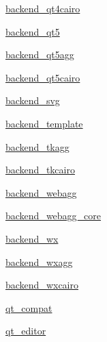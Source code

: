 \begin{DoxyCompactItemize}
 \hyperlink{namespacematplotlib_1_1backends_1_1backend__qt4cairo}{backend\+\_\+qt4cairo}
\item 
 \hyperlink{namespacematplotlib_1_1backends_1_1backend__qt5}{backend\+\_\+qt5}
\item 
 \hyperlink{namespacematplotlib_1_1backends_1_1backend__qt5agg}{backend\+\_\+qt5agg}
\item 
 \hyperlink{namespacematplotlib_1_1backends_1_1backend__qt5cairo}{backend\+\_\+qt5cairo}
\item 
 \hyperlink{namespacematplotlib_1_1backends_1_1backend__svg}{backend\+\_\+svg}
\item 
 \hyperlink{namespacematplotlib_1_1backends_1_1backend__template}{backend\+\_\+template}
\item 
 \hyperlink{namespacematplotlib_1_1backends_1_1backend__tkagg}{backend\+\_\+tkagg}
\item 
 \hyperlink{namespacematplotlib_1_1backends_1_1backend__tkcairo}{backend\+\_\+tkcairo}
\item 
 \hyperlink{namespacematplotlib_1_1backends_1_1backend__webagg}{backend\+\_\+webagg}
\item 
 \hyperlink{namespacematplotlib_1_1backends_1_1backend__webagg__core}{backend\+\_\+webagg\+\_\+core}
\item 
 \hyperlink{namespacematplotlib_1_1backends_1_1backend__wx}{backend\+\_\+wx}
\item 
 \hyperlink{namespacematplotlib_1_1backends_1_1backend__wxagg}{backend\+\_\+wxagg}
\item 
 \hyperlink{namespacematplotlib_1_1backends_1_1backend__wxcairo}{backend\+\_\+wxcairo}
\item 
 \hyperlink{namespacematplotlib_1_1backends_1_1qt__compat}{qt\+\_\+compat}
\item 
 \hyperlink{namespacematplotlib_1_1backends_1_1qt__editor}{qt\+\_\+editor}
\end{DoxyCompactItemize}
